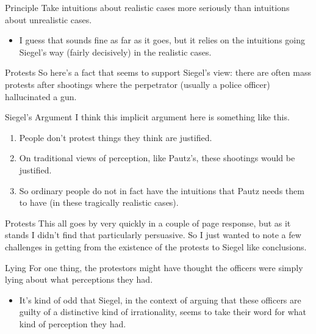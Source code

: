 \documentclass[
  17pt,
  letterpaper,
  ignorenonframetext,
  aspectratio=169,
  xcolor={dvipsnames}]{beamer}
\providecommand{\tightlist}{%
  \setlength{\itemsep}{0pt}\setlength{\parskip}{0pt}}\usepackage{longtable,booktabs,array}
\begin{document}
\begin{frame}{Principle}
\protect\hypertarget{principle}{}
Take intuitions about realistic cases more seriously than intuitions
about unrealistic cases.

\begin{itemize}[<+->]
\tightlist
\item
  I guess that sounds fine as far as it goes, but it relies on the
  intuitions going Siegel's way (fairly decisively) in the realistic
  cases.
\end{itemize}
\end{frame}

\begin{frame}{Protests}
\protect\hypertarget{protests}{}
So here's a fact that seems to support Siegel's view: there are often
mass protests after shootings where the perpetrator (usually a police
officer) hallucinated a gun.
\end{frame}

\begin{frame}{Siegel's Argument}
\protect\hypertarget{siegels-argument}{}
I think this implicit argument here is something like this.

\begin{enumerate}[<+->]
\tightlist
\item
  People don't protest things they think are justified.
\item
  On traditional views of perception, like Pautz's, these shootings
  would be justified.
\item
  So ordinary people do not in fact have the intuitions that Pautz needs
  them to have (in these tragically realistic cases).
\end{enumerate}
\end{frame}

\begin{frame}{Protests}
\protect\hypertarget{protests-1}{}
This all goes by very quickly in a couple of page response, but as it
stands I didn't find that particularly persuasive. So I just wanted to
note a few challenges in getting from the existence of the protests to
Siegel like conclusions.
\end{frame}

\begin{frame}{Lying}
\protect\hypertarget{lying}{}
For one thing, the protestors might have thought the officers were
simply lying about what perceptions they had.

\begin{itemize}[<+->]
\tightlist
\item
  It's kind of odd that Siegel, in the context of arguing that these
  officers are guilty of a distinctive kind of irrationality, seems to
  take their word for what kind of perception they had.
\end{itemize}
\end{frame}
\end{document}
